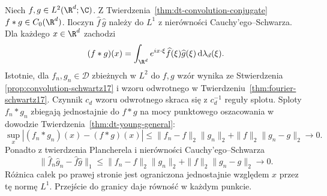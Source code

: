 \begin{przyklad}
\label{ex:dt-convolution-two-l2}
Niech $f,g\in L^2(\R^d;\C)$. Z
Twierdzenia~\ref{thm:dt-convolution-conjugate}
$f*g\in C_0(\R^d)$.
Iloczyn $\widehat f\,\widehat g$ należy do $L^1$
z nierówności Cauchy'ego--Schwarza.
Dla każdego $x\in\R^d$ zachodzi
\[
 (f*g)(x)=
 \int_{\R^d}e^{ix\cdot\xi}\widehat f(\xi)\widehat g(\xi)
 \,\mathrm d\lambda_d(\xi).
\]
Istotnie, dla $f_n,g_n\in\mathcal D$ zbieżnych w $L^2$
do $f,g$ wzór wynika ze Stwierdzenia
\ref{prop:convolution-schwartz17} i wzoru odwrotnego
w Twierdzeniu~\ref{thm:fourier-schwartz17}.
Czynnik $c_d$ wzoru odwrotnego skraca się z
$c_d^{-1}$ reguły splotu.
Sploty $f_n*g_n$ zbiegają jednostajnie do $f*g$
na mocy punktowego oszacowania w dowodzie
Twierdzenia~\ref{thm:dt-young-general}:
\[
 \sup_x|(f_n*g_n)(x)-(f*g)(x)|
 \le\|f_n-f\|_2\|g_n\|_2+\|f\|_2\|g_n-g\|_2
 \longrightarrow0.
\]
Ponadto z twierdzenia Plancherela i nierówności
Cauchy'ego--Schwarza
\[
 \|\widehat f_n\widehat g_n-\widehat f\widehat g\|_1
 \le\|f_n-f\|_2\|g_n\|_2+\|f\|_2\|g_n-g\|_2
 \longrightarrow0.
\]
Różnica całek po prawej stronie jest ograniczona
jednostajnie względem $x$ przez tę normę $L^1$.
Przejście do granicy daje równość w każdym punkcie.
\end{przyklad}
